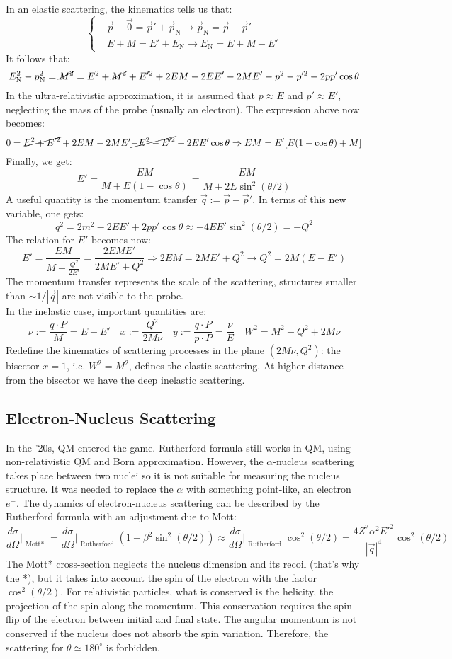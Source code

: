 \documentclass[10.75pt,a4paper,openright,bottom=2cm]{article}
\begin{document}
In an elastic scattering, the kinematics tells us that:
\[
\left\{
\begin{aligned}
&\Vec{p}+\Vec{0}=\Vec{p}'+\Vec{p}_{\text{N}}\to\Vec{p}_{\text{N}}=\Vec{p}-\Vec{p}'\\
&E+M=E'+E_{\text{N}}\to E_{\text{N}}=E+M-E'
\end{aligned}
\right.
\]
It follows that:
\[
E_{\text{N}}^2-p_{\text{N}}^2=\cancel{M^2}=E^2+\cancel{M^2}+E'^2+2EM-2EE'-2ME'-p^2-p'^2-2pp'\cos\theta
\]
In the ultra-relativistic approximation, it is assumed that $p\approx E$ and $p'\approx E'$, neglecting the mass of the probe (usually an electron). The expression above now becomes:
\[
0=\cancel{E^2+E'^2}+2EM-2ME'\cancel{-E^2-E'^2}+2EE'\cos\theta\Rightarrow EM=E'[E(1-\cos\theta)+M]
\]
Finally, we get:
\[
E'=\frac{EM}{M+E(1-\cos\theta)}=\frac{EM}{M+2E\sin^2(\theta/2)}
\]
A useful quantity is the momentum transfer $\Vec{q}:=\Vec{p}-\Vec{p}'$. In terms of this new variable, one gets:
\[
q^2=2m^2-2EE'+2pp'\cos\theta\approx-4EE'\sin^2(\theta/2)=-Q^2
\]
The relation for $E'$ becomes now:
\[
E'=\frac{EM}{M+\frac{Q^2}{2E'}}=\frac{2EME'}{2ME'+Q^2}\Rightarrow 2EM=2ME'+Q^2\to Q^2=2M(E-E')
\]
The momentum transfer represents the scale of the scattering, structures smaller than $\sim1/|\Vec{q}|$ are not visible to the probe.\\
In the inelastic case, important quantities are:
\[
\nu:=\frac{q\cdot P}{M}=E-E' \quad x:=\frac{Q^2}{2M\nu} \quad y:=\frac{q\cdot P}{p\cdot P}=\frac{\nu}{E} \quad W^2=M^2-Q^2+2M\nu
\]
Redefine the kinematics of scattering processes in the plane $(2M\nu,Q^2)$: the bisector $x=1$, i.e. $W^2=M^2$, defines the elastic scattering. At higher distance from the bisector we have the deep inelastic scattering.
\subsection{Electron-Nucleus Scattering}
In the '20s, QM entered the game. Rutherford formula still works in QM, using non-relativistic QM and Born approximation. However, the $\alpha$-nucleus scattering takes place between two nuclei so it is not suitable for measuring the nucleus structure. It was needed to replace the $\alpha$ with something point-like, an electron $e^-$. The dynamics of electron-nucleus scattering can be described by the Rutherford formula with an adjustment due to Mott:
\[
\frac{d\sigma}{d\Omega}\Bigr|_{\substack{\text{Mott*}}}=\frac{d\sigma}{d\Omega}\Bigr|_{\substack{\text{Rutherford}}}\left(1-\beta^2\sin^2(\theta/2)\right)\approx\frac{d\sigma}{d\Omega}\Bigr|_{\substack{\text{Rutherford}}}\cos^2(\theta/2)=\frac{4Z^2\alpha^2E'^2}{|\Vec{q}|^4}\cos^2(\theta/2)
\]
The Mott* cross-section neglects the nucleus dimension and its recoil (that's why the *), but it takes into account the spin of the electron with the factor $\cos^2(\theta/2)$. For relativistic particles, what is conserved is the helicity, the projection of the spin along the momentum. This conservation requires the spin flip of the electron between initial and final state. The angular momentum is not conserved if the nucleus does not absorb the spin variation. Therefore, the scattering for $\theta\simeq180^\circ$ is forbidden.
\end{document}
